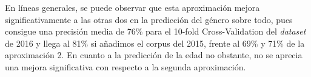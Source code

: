 En líneas generales, se puede observar que esta aproximación mejora significativamente a las otras dos en la predicción del género sobre todo, pues consigue una precisión media de 76\% para el 10-fold Cross-Validation del \textit{dataset} de 2016 y llega al 81\% si añadimos el corpus del 2015, frente al 69\% y 71\% de la aproximación 2. En cuanto a la predicción de la edad no obstante, no se aprecia una mejora significativa con respecto a la segunda aproximación.


